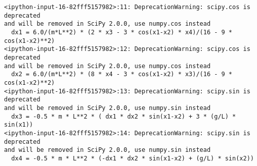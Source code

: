 \documentclass[11pt]{article}
\begin{document}
    \begin{Verbatim}[commandchars=\\\{\}]
<ipython-input-16-82fff5157982>:11: DeprecationWarning: scipy.cos is deprecated
and will be removed in SciPy 2.0.0, use numpy.cos instead
  dx1 = 6.0/(m*L**2) * (2 * x3 - 3 * cos(x1-x2) * x4)/(16 - 9 * cos(x1-x2)**2)
<ipython-input-16-82fff5157982>:12: DeprecationWarning: scipy.cos is deprecated
and will be removed in SciPy 2.0.0, use numpy.cos instead
  dx2 = 6.0/(m*L**2) * (8 * x4 - 3 * cos(x1-x2) * x3)/(16 - 9 * cos(x1-x2)**2)
<ipython-input-16-82fff5157982>:13: DeprecationWarning: scipy.sin is deprecated
and will be removed in SciPy 2.0.0, use numpy.sin instead
  dx3 = -0.5 * m * L**2 * ( dx1 * dx2 * sin(x1-x2) + 3 * (g/L) * sin(x1))
<ipython-input-16-82fff5157982>:14: DeprecationWarning: scipy.sin is deprecated
and will be removed in SciPy 2.0.0, use numpy.sin instead
  dx4 = -0.5 * m * L**2 * (-dx1 * dx2 * sin(x1-x2) + (g/L) * sin(x2))
    \end{Verbatim}
\end{document}
